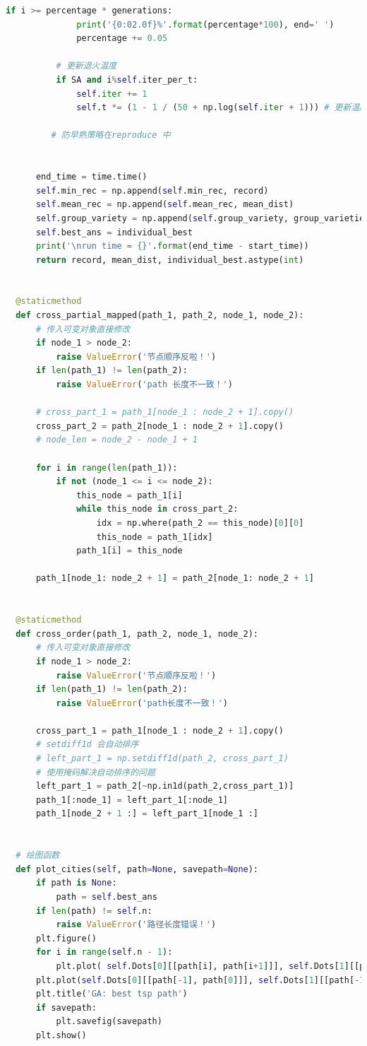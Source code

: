 \documentclass[12pt]{article}
\begin{document}
\begin{lstlisting}[language = Python, caption = GA算法计算TSP的类]
          if i >= percentage * generations:
              print('{0:02.0f}%'.format(percentage*100), end=' ')
              percentage += 0.05

          # 更新退火温度
          if SA and i%self.iter_per_t:
              self.iter += 1
              self.t *= (1 - 1 / (50 + np.log(self.iter + 1))) # 更新温度

         # 防早熟策略在reproduce 中


      end_time = time.time()
      self.min_rec = np.append(self.min_rec, record)
      self.mean_rec = np.append(self.mean_rec, mean_dist)
      self.group_variety = np.append(self.group_variety, group_varieties)
      self.best_ans = individual_best
      print('\nrun time = {}'.format(end_time - start_time))
      return record, mean_dist, individual_best.astype(int)


  @staticmethod
  def cross_partial_mapped(path_1, path_2, node_1, node_2):
      # 传入可变对象直接修改
      if node_1 > node_2:
          raise ValueError('节点顺序反啦！')
      if len(path_1) != len(path_2):
          raise ValueError('path 长度不一致！')
  
      # cross_part_1 = path_1[node_1 : node_2 + 1].copy()
      cross_part_2 = path_2[node_1 : node_2 + 1].copy()
      # node_len = node_2 - node_1 + 1
      
      for i in range(len(path_1)):
          if not (node_1 <= i <= node_2):
              this_node = path_1[i]
              while this_node in cross_part_2:
                  idx = np.where(path_2 == this_node)[0][0]
                  this_node = path_1[idx]
              path_1[i] = this_node

      path_1[node_1: node_2 + 1] = path_2[node_1: node_2 + 1]


  @staticmethod
  def cross_order(path_1, path_2, node_1, node_2):
      # 传入可变对象直接修改
      if node_1 > node_2:
          raise ValueError('节点顺序反啦！')
      if len(path_1) != len(path_2):
          raise ValueError('path长度不一致！')

      cross_part_1 = path_1[node_1 : node_2 + 1].copy()
      # setdiff1d 会自动排序
      # left_part_1 = np.setdiff1d(path_2, cross_part_1)
      # 使用掩码解决自动排序的问题
      left_part_1 = path_2[~np.in1d(path_2,cross_part_1)]
      path_1[:node_1] = left_part_1[:node_1]
      path_1[node_2 + 1 :] = left_part_1[node_1 :]


  # 绘图函数
  def plot_cities(self, path=None, savepath=None):
      if path is None:
          path = self.best_ans
      if len(path) != self.n:
          raise ValueError('路径长度错误！')
      plt.figure()
      for i in range(self.n - 1):
          plt.plot( self.Dots[0][[path[i], path[i+1]]], self.Dots[1][[path[i], path[i+1]]], 'b*-')
      plt.plot(self.Dots[0][[path[-1], path[0]]], self.Dots[1][[path[-1], path[0]]], 'b*-') 
      plt.title('GA: best tsp path')
      if savepath:
          plt.savefig(savepath)
      plt.show()


\end{lstlisting}
\end{document}
